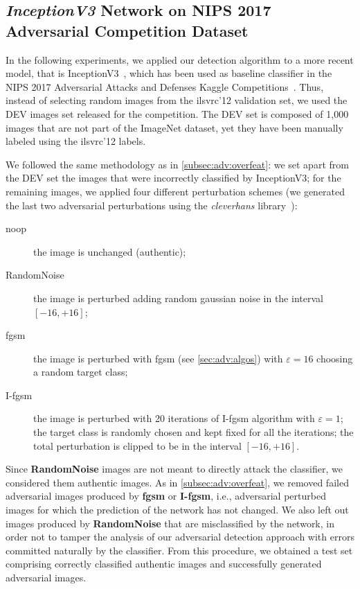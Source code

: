 \subsection{\emph{InceptionV3} Network on NIPS 2017 Adversarial Competition Dataset}
\label{subsec:adv:inception}

In the following experiments, we applied our detection algorithm to a more recent model, that is InceptionV3~\cite{szegedy2016rethinking}, which has been used as baseline classifier in the NIPS 2017 Adversarial Attacks and Defenses Kaggle Competitions~\cite{kurakin2018adversarial}.
Thus, instead of selecting random images from the \gls{ilsvrc}'12 validation set, we used the DEV images set released for the competition.
The DEV set is composed of 1,000 images that are not part of the ImageNet dataset, yet they have been manually labeled using the \gls{ilsvrc}'12 labels.

We followed the same methodology as in \ref{subsec:adv:overfeat}: we set apart from the DEV set the images that were incorrectly classified by InceptionV3; for the remaining images, we applied four different perturbation schemes (we generated the last two adversarial perturbations using the \emph{cleverhans} library~\cite{papernot2018cleverhans}):

\begin{description}%
  \item[noop] the image is unchanged (authentic);
  \item[RandomNoise] the image is perturbed adding random gaussian noise in the interval $[-16, +16]$;
  \item[\gls{fgsm}] the image is perturbed with \gls{fgsm} (see \ref{sec:adv:algos}) with $\varepsilon = 16$ choosing a random target class;
  \item[I-\gls{fgsm}] the image is perturbed with 20 iterations of I-\gls{fgsm} algorithm with $\varepsilon = 1$; the target class is randomly chosen and kept fixed for all the iterations; the total perturbation is clipped to be in the interval $[-16, +16]$.
\end{description}

Since \textbf{RandomNoise} images are not meant to directly attack the classifier, we considered them authentic images. %
As in \ref{subsec:adv:overfeat}, we removed failed adversarial images produced by \textbf{\gls{fgsm}} or \textbf{I-\gls{fgsm}}, i.e., adversarial perturbed images for which the prediction of the network has not changed.
We also left out images produced by \textbf{RandomNoise} that are misclassified by the network, in order not to tamper the analysis of our adversarial detection approach with errors committed naturally by the classifier.
From this procedure, we obtained a test set comprising correctly classified authentic images and successfully generated adversarial images.

